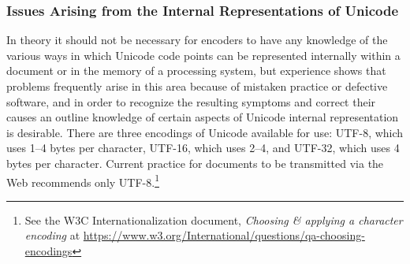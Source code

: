 \subsubsection[{Issues Arising from the Internal Representations of Unicode}]{Issues Arising from the Internal Representations of Unicode}\label{D4-48}\par
In theory it should not be necessary for encoders to have any knowledge of the various ways in which Unicode code points can be represented internally within a document or in the memory of a processing system, but experience shows that problems frequently arise in this area because of mistaken practice or defective software, and in order to recognize the resulting symptoms and correct their causes an outline knowledge of certain aspects of Unicode internal representation is desirable. There are three encodings of Unicode available for use: UTF-8, which uses 1–4 bytes per character, UTF-16, which uses 2–4, and UTF-32, which uses 4 bytes per character. Current practice for documents to be transmitted via the Web recommends only UTF-8.\footnote{See the W3C Internationalization document, \textit{Choosing \& applying a character encoding} at \url{https://www.w3.org/International/questions/qa-choosing-encodings}}

